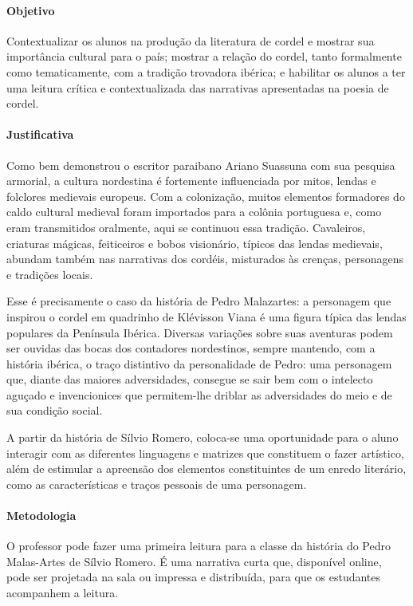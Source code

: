 \documentclass[11pt]{extarticle}
\begin{document}
\paragraph{Objetivo} Contextualizar os alunos na produção da literatura de cordel e mostrar sua importância cultural para o país; mostrar a relação do cordel, tanto formalmente como tematicamente, com a tradição trovadora ibérica; e habilitar os alunos a ter uma leitura crítica e contextualizada das narrativas apresentadas na poesia de cordel.

\paragraph{Justificativa} Como bem demonstrou o escritor paraibano Ariano Suassuna com sua pesquisa armorial, a cultura nordestina é fortemente influenciada por mitos, lendas e folclores medievais europeus. Com a colonização, muitos elementos formadores do caldo cultural medieval foram importados para a colônia portuguesa e, como eram transmitidos oralmente, aqui se continuou essa tradição. Cavaleiros, criaturas mágicas, feiticeiros e bobos visionário, típicos das lendas medievais, abundam também nas narrativas dos cordéis, misturados às crenças, personagens e tradições locais.

Esse é precisamente o caso da história de Pedro Malazartes: a personagem que inspirou o cordel em quadrinho de Klévisson Viana é uma figura típica das lendas populares da Península Ibérica. Diversas variações sobre suas aventuras podem ser ouvidas das bocas dos contadores nordestinos, sempre mantendo, com a história ibérica, o traço distintivo da personalidade de Pedro: uma personagem que, diante das maiores adversidades, consegue se sair bem com o intelecto aguçado e invencionices que permitem-lhe driblar as adversidades do meio e de sua condição social.

A partir da história de Sílvio Romero, coloca-se uma oportunidade para o aluno interagir com as diferentes linguagens e matrizes que constituem o fazer artístico, além de estimular a apreensão dos elementos constituintes de um enredo literário, como as características e traços pessoais de uma personagem.


\paragraph{Metodologia} O professor pode fazer uma primeira leitura para a classe da história do Pedro Malas-Artes de Sílvio Romero. É uma narrativa curta que, disponível online, pode ser projetada na sala ou impressa e distribuída, para que os estudantes acompanhem a leitura.
\end{document}
